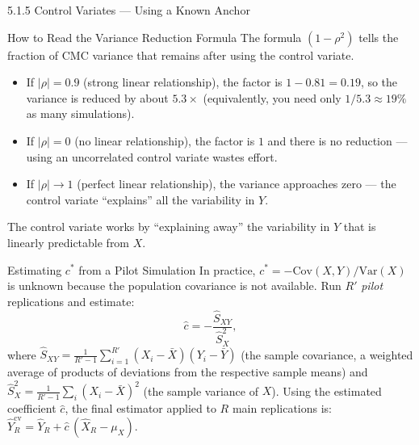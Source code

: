 \documentclass[aspectratio=169,10pt]{beamer}
\begin{document}
\begin{frame}[allowframebreaks]{5.1.5 Control Variates --- Using a Known Anchor}
\begin{alertblock}{How to Read the Variance Reduction Formula}
  The formula $(1-\rho^2)$ tells the fraction of CMC variance that remains
  after using the control variate.
  \begin{itemize}
    \item If $|\rho| = 0.9$ (strong linear relationship), the factor is
          $1-0.81 = 0.19$, so the variance is reduced by about $5.3\times$
          (equivalently, you need only $1/5.3 \approx 19\%$ as many simulations).
    \item If $|\rho| = 0$ (no linear relationship), the factor is $1$ and
          there is no reduction --- using an uncorrelated control variate
          wastes effort.
    \item If $|\rho| \to 1$ (perfect linear relationship), the variance
          approaches zero --- the control variate ``explains'' all the
          variability in $Y$.
  \end{itemize}
  The control variate works by ``explaining away'' the variability in $Y$
  that is linearly predictable from $X$.
\end{alertblock}

\framebreak

\begin{block}{Estimating $c^*$ from a Pilot Simulation}
  In practice, $c^* = -\mathrm{Cov}(X,Y)/\mathrm{Var}(X)$ is unknown because
  the population covariance is not available.
  Run $R'$ \emph{pilot} replications and estimate:
  \[
    \hat{c} = -\frac{\hat{S}_{XY}}{\hat{S}_X^2},
  \]
  where $\hat{S}_{XY} = \frac{1}{R'-1}\sum_{i=1}^{R'}(X_i-\bar{X})(Y_i-\bar{Y})$
  (the sample covariance, a weighted average of products of deviations from
  the respective sample means) and $\hat{S}_X^2 = \frac{1}{R'-1}\sum_i(X_i-\bar{X})^2$
  (the sample variance of $X$).
  Using the estimated coefficient $\hat{c}$, the final estimator applied to
  $R$ main replications is:
  $\hat{Y}_R^{\mathrm{cv}} = \hat{Y}_R + \hat{c}\,(\hat{X}_R - \mu_X)$.
\end{block}


\end{frame}
\end{document}
